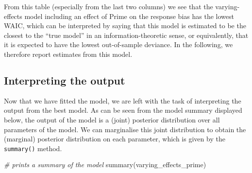 \documentclass[
  11pt,
  english,
  ,doc,floatsintext]{apa6}
\newenvironment{Shaded}{}{}
\newcommand{\CommentTok}[1]{\textcolor[rgb]{0.38,0.63,0.69}{\textit{#1}}}
\newcommand{\FunctionTok}[1]{\textcolor[rgb]{0.02,0.16,0.49}{#1}}
\newcommand{\NormalTok}[1]{#1}
\begin{document}
From this table (especially from the last two columns) we see that the varying-effects model including an effect of Prime on the response bias has the lowest WAIC, which can be interpreted by saying that this model is estimated to be the closest to the ``true model'' in an information-theoretic sense, or equivalently, that it is expected to have the lowest out-of-sample deviance. In the following, we therefore report estimates from this model.

\hypertarget{interpreting-the-output}{%
\subsection{Interpreting the output}\label{interpreting-the-output}}

Now that we have fitted the model, we are left with the task of interpreting the output from the best model. As can be seen from the model summary displayed below, the output of the model is a (joint) posterior distribution over all parameters of the model. We can marginalise this joint distribution to obtain the (marginal) posterior distribution on each parameter, which is given by the \texttt{summary()} method.

\begin{Shaded}
\begin{Highlighting}[]
\CommentTok{\# prints a summary of the model}
\FunctionTok{summary}\NormalTok{(varying\_effects\_prime)}
\end{Highlighting}
\end{Shaded}
\end{document}
